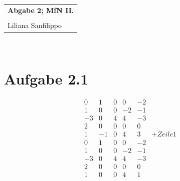 \documentclass{article} %
\newcommand{\titulo}{Abgabe 2; MfN II.}
\newcommand{\nombre}{Liliana Sanfilippo}
\begin{document}
\begin{tabular}{p{12cm}}
{{\Large\bf\titulo}}\\
\vspace{0.2cm}\\
 {\large\nombre}\\
\end{tabular}
\vspace{0.2cm}\\
\section{Aufgabe 2.1}
\[
\begin{array}{rrrrrr}
    0 & 1 & 0 & 0 & -2   \\
    1 & 0 & 0 & -2 & -1 \\
    -3 & 0 & 4 & 4 & -3 \\
    2 & 0 & 0 & 0 & 0 \\
    1 & -1 & 0 & 4 & 3 & +Zeile1 \\ \hline
    0 & 1 & 0 & 0 & -2   \\
    1 & 0 & 0 & -2 & -1 \\
    -3 & 0 & 4 & 4 & -3 \\
    2 & 0 & 0 & 0 & 0 \\
    1 & 0 & 0 & 4 & 1 

\end{array}\]
\end{document}
